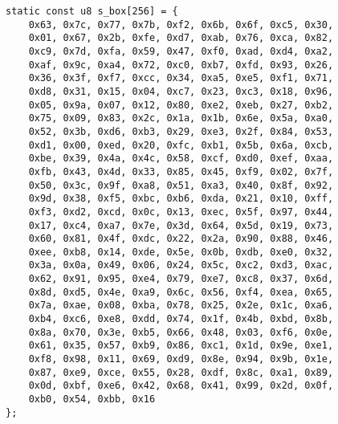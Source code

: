 \newpage
\begin{lstlisting}[style=C, caption={},captionpos=t]
static const u8 s_box[256] = {
	0x63, 0x7c, 0x77, 0x7b, 0xf2, 0x6b, 0x6f, 0xc5, 0x30,
	0x01, 0x67, 0x2b, 0xfe, 0xd7, 0xab, 0x76, 0xca, 0x82,
	0xc9, 0x7d, 0xfa, 0x59, 0x47, 0xf0, 0xad, 0xd4, 0xa2,
	0xaf, 0x9c, 0xa4, 0x72, 0xc0, 0xb7, 0xfd, 0x93, 0x26,
	0x36, 0x3f, 0xf7, 0xcc, 0x34, 0xa5, 0xe5, 0xf1, 0x71,
	0xd8, 0x31, 0x15, 0x04, 0xc7, 0x23, 0xc3, 0x18, 0x96,
	0x05, 0x9a, 0x07, 0x12, 0x80, 0xe2, 0xeb, 0x27, 0xb2,
	0x75, 0x09, 0x83, 0x2c, 0x1a, 0x1b, 0x6e, 0x5a, 0xa0,
	0x52, 0x3b, 0xd6, 0xb3, 0x29, 0xe3, 0x2f, 0x84, 0x53,
	0xd1, 0x00, 0xed, 0x20, 0xfc, 0xb1, 0x5b, 0x6a, 0xcb,
	0xbe, 0x39, 0x4a, 0x4c, 0x58, 0xcf, 0xd0, 0xef, 0xaa,
	0xfb, 0x43, 0x4d, 0x33, 0x85, 0x45, 0xf9, 0x02, 0x7f,
	0x50, 0x3c, 0x9f, 0xa8, 0x51, 0xa3, 0x40, 0x8f, 0x92,
	0x9d, 0x38, 0xf5, 0xbc, 0xb6, 0xda, 0x21, 0x10, 0xff,
	0xf3, 0xd2, 0xcd, 0x0c, 0x13, 0xec, 0x5f, 0x97, 0x44,
	0x17, 0xc4, 0xa7, 0x7e, 0x3d, 0x64, 0x5d, 0x19, 0x73,
	0x60, 0x81, 0x4f, 0xdc, 0x22, 0x2a, 0x90, 0x88, 0x46,
	0xee, 0xb8, 0x14, 0xde, 0x5e, 0x0b, 0xdb, 0xe0, 0x32,
	0x3a, 0x0a, 0x49, 0x06, 0x24, 0x5c, 0xc2, 0xd3, 0xac,
	0x62, 0x91, 0x95, 0xe4, 0x79, 0xe7, 0xc8, 0x37, 0x6d,
	0x8d, 0xd5, 0x4e, 0xa9, 0x6c, 0x56, 0xf4, 0xea, 0x65,
	0x7a, 0xae, 0x08, 0xba, 0x78, 0x25, 0x2e, 0x1c, 0xa6,
	0xb4, 0xc6, 0xe8, 0xdd, 0x74, 0x1f, 0x4b, 0xbd, 0x8b,
	0x8a, 0x70, 0x3e, 0xb5, 0x66, 0x48, 0x03, 0xf6, 0x0e,
	0x61, 0x35, 0x57, 0xb9, 0x86, 0xc1, 0x1d, 0x9e, 0xe1,
	0xf8, 0x98, 0x11, 0x69, 0xd9, 0x8e, 0x94, 0x9b, 0x1e,
	0x87, 0xe9, 0xce, 0x55, 0x28, 0xdf, 0x8c, 0xa1, 0x89,
	0x0d, 0xbf, 0xe6, 0x42, 0x68, 0x41, 0x99, 0x2d, 0x0f,
	0xb0, 0x54, 0xbb, 0x16
};
\end{lstlisting}

